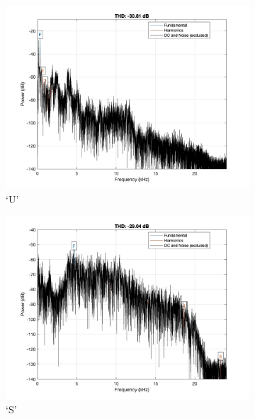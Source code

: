 \documentclass[11pt, oneside]{article}   	%
\begin{document}
\begin{figure}[ht]
\centering
\begin{subfigure}[b]{0.3\textwidth}
\includegraphics[width=\textwidth]{imgs/u-power.jpg}
\caption{`U'}
\end{subfigure}
\begin{subfigure}[b]{0.3\textwidth}
\includegraphics[width=\textwidth]{imgs/s-power.jpg}
\caption{`S'}
\end{subfigure}
\begin{subfigure}[b]{0.3\textwidth}

\end{subfigure}
\end{figure}
\end{document}
